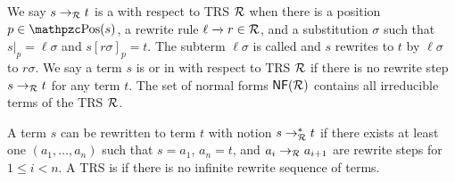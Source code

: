 %
\begin{definition}
	We say \( s\rightarrow_{\mathcal{R}} t \) is a
	 with respect to TRS \( \mathcal{R} \)
	when there is a position \( p \in \pos(s) \),
	a rewrite rule \( \ell\xrightarrow[{}]{} r\in\mathcal{R} \),
	and a substitution \( \sigma \) such that
	\( s|_p=\ell\sigma \) and \( s[r\sigma]_p = t \).
		The subterm \( \ell\sigma \) is called  and
	\( s \) rewrites to \( t \) by  \( \ell\sigma \) to  \( r\sigma \).
	We say a term \( s \) is  or in  with respect to TRS \( \mathcal{R} \) if there is no rewrite step \( s\rightarrow_{\mathcal{R}} t \) for any term \( t \).
	The set of normal forms \( \mathsf{NF}(\mathcal{R}) \) contains all irreducible terms of the TRS \( \mathcal{R} \).

	\end{definition}
%
%
\begin{definition}
	A term \( s \) can be rewritten to term \( t \) with notion \( s\rightarrow^*_{\mathcal{R}} t \)
	if there exists at least one  \( (a_1,\ldots ,a_n) \) such that
	\( s=a_1 \), \( a_n=t \), and \( a_i\rightarrow_{\mathcal{R}} a_{i+1} \) are rewrite steps for \( 1\leq i<n \).
	A TRS is  if there is no infinite rewrite sequence of terms.
\end{definition}
